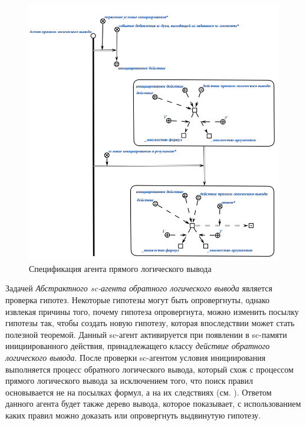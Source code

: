 \begin{figure}[http]
	\includegraphics[scale=0.8]{author/part3/figures/direct_inference_agent.png}
	\caption{Спецификация агента прямого логического вывода}
	\label{fig:direct_inference_agent}
\end{figure}

Задачей \textit{Абстрактного sc-агента обратного логического вывода} является проверка гипотез. Некоторые гипотезы могут быть опровергнуты, однако извлекая причины того, почему гипотеза опровергнута, можно изменить посылку гипотезы так, чтобы создать новую гипотезу, которая впоследствии может стать полезной теоремой. Данный sc-агент активируется при появлении в sc-памяти инициированного действия, принадлежащего классу \textit{действие обратного логического вывода}. После проверки sc-агентом условия инициирования выполняется процесс обратного логического вывода, который схож с процессом прямого логического вывода за исключением того, что поиск правил основывается не на посылках формул, а на их следствиях (см. ). Ответом данного агента будет также дерево вывода, которое показывает, с использованием каких правил можно доказать или опровергнуть выдвинутую гипотезу.

